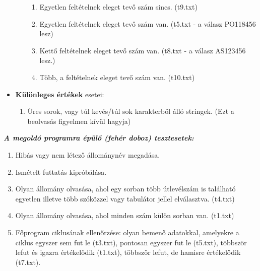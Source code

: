 \documentclass[12pt]{report}
\begin{document}
\begin{itemize}[noitemsep]
\begin{itemize}[noitemsep]
\begin{enumerate}[noitemsep]
\item Egyetlen feltételnek eleget tevő szám sincs. (t9.txt)
\item Egyetlen feltételnek eleget tevő szám van. (t5.txt - a válasz PO118456 lesz)
\item Kettő feltételnek eleget tevő szám van. (t8.txt - a válasz AS123456 lesz.)
\item Több, a feltételnek eleget tevő szám van. (t10.txt)
\end{enumerate}
\end{itemize}
\item \textbf{Különleges értékek} esetei:
\begin{enumerate}[noitemsep]
\item Üres sorok, vagy túl kevés/túl sok karakterből álló stringek. (Ezt a beolvasás figyelmen kívül hagyja)
\end{enumerate}
\end{itemize}

\textit{\textbf{A megoldó programra épülő (fehér doboz) tesztesetek:}}
\begin{enumerate}[noitemsep]
  \item Hibás vagy nem létező állománynév megadása.
  \item Ismételt futtatás kipróbálása.
  \item Olyan állomány olvasása, ahol egy sorban több útlevélszám is található egyetlen illetve több szóközzel vagy tabulátor jellel elválasztva. (t4.txt)
  \item Olyan állomány olvasása, ahol minden szám külön sorban van. (t1.txt)
  \item Főprogram ciklusának ellenőrzése: olyan bemenő adatokkal, amelyekre a ciklus egyszer sem fut le (t3.txt), pontosan egyszer fut le (t5.txt), többször lefut és igazra értékelődik (t1.txt), többször lefut, de hamisre értékelődik (t7.txt).
\end{enumerate}
\end{document}
